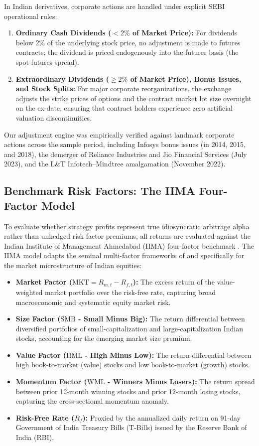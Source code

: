\documentclass[11pt,a4paper]{article}
\begin{document}
In Indian derivatives, corporate actions are handled under explicit SEBI operational rules:
\begin{enumerate}
    \item \textbf{Ordinary Cash Dividends ($< 2\%$ of Market Price):} For dividends below 2\% of the underlying stock price, no adjustment is made to futures contracts; the dividend is priced endogenously into the futures basis (the spot-futures spread).
    \item \textbf{Extraordinary Dividends ($\ge 2\%$ of Market Price), Bonus Issues, and Stock Splits:} For major corporate reorganizations, the exchange adjusts the strike prices of options and the contract market lot size overnight on the ex-date, ensuring that contract holders experience zero artificial valuation discontinuities.
\end{enumerate}
Our adjustment engine was empirically verified against landmark corporate actions across the sample period, including Infosys bonus issues (in 2014, 2015, and 2018), the demerger of Reliance Industries and Jio Financial Services (July 2023), and the L\&T Infotech--Mindtree amalgamation (November 2022).

\subsection{Benchmark Risk Factors: The IIMA Four-Factor Model}
To evaluate whether strategy profits represent true idiosyncratic arbitrage alpha rather than unhedged risk factor premiums, all returns are evaluated against the Indian Institute of Management Ahmedabad (IIMA) four-factor benchmark \citep{agarwalla2014four}. The IIMA model adapts the seminal multi-factor frameworks of \citet{fama1993common} and \citet{carhart1997persistence} specifically for the market microstructure of Indian equities:
\begin{itemize}
    \item \textbf{Market Factor ($\text{MKT} = R_{m,t} - R_{f,t}$):} The excess return of the value-weighted market portfolio over the risk-free rate, capturing broad macroeconomic and systematic equity market risk.
    \item \textbf{Size Factor ($\text{SMB}$ - Small Minus Big):} The return differential between diversified portfolios of small-capitalization and large-capitalization Indian stocks, accounting for the emerging market size premium.
    \item \textbf{Value Factor ($\text{HML}$ - High Minus Low):} The return differential between high book-to-market (value) stocks and low book-to-market (growth) stocks.
    \item \textbf{Momentum Factor ($\text{WML}$ - Winners Minus Losers):} The return spread between prior 12-month winning stocks and prior 12-month losing stocks, capturing the cross-sectional momentum anomaly.
    \item \textbf{Risk-Free Rate ($R_f$):} Proxied by the annualized daily return on 91-day Government of India Treasury Bills (T-Bills) issued by the Reserve Bank of India (RBI).
\end{itemize}
\end{document}
